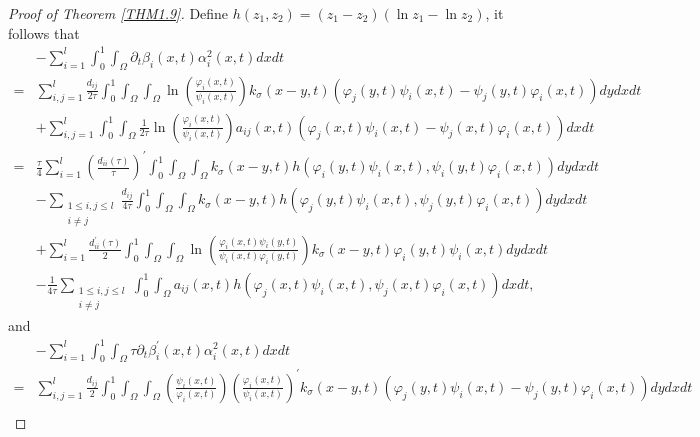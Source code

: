 \documentclass[11pt,reqno]{amsart}
\numberwithin{equation}{section}
\begin{document}
\begin{proof}[Proof of Theorem \ref{THM1.9}]
Define $h(z_{1},z_{2})=(z_{1}-z_{2})\left( \ln z_{1} - \ln z_{2} \right)$, it follows that
\begin{align}\label{3-21}
&- \sum_{i=1}^{l} \int_{0}^{1}  \int_{\Omega} \partial_{t}\beta_{i}(x,t)\alpha_{i}^{2}(x,t) dx dt
\\ \nonumber
=& \sum_{i,j=1}^{l} \frac{d_{ij}}{2\tau} \int_{0}^{1}  \int_{\Omega} \int_{\Omega}  \ln\left( \frac{\varphi_{i}(x,t)}{\psi_{i}(x,t)} \right) k_{\sigma}(x-y,t) \left( \varphi_{j}(y,t)\psi_{i}(x,t)-\psi_{j}(y,t)\varphi_{i}(x,t) \right)dydxdt
\\ \nonumber
& +\sum_{i,j=1}^{l} \int_{0}^{1}  \int_{\Omega} \frac{1}{2\tau} \ln\left( \frac{\varphi_{i}(x,t)}{\psi_{i}(x,t)} \right) a_{ij}(x,t)\left( \varphi_{j}(x,t)\psi_{i}(x,t)-\psi_{j}(x,t)\varphi_{i}(x,t) \right)dxdt
\\ \nonumber
=& \frac{\tau}{4} \sum_{i=1}^{l}\left( \frac{d_{ii}(\tau)}{\tau} \right)^{\prime}\int_{0}^{1}  \int_{\Omega} \int_{\Omega} k_{\sigma}(x-y,t) h(\varphi_{i}(y,t)\psi_{i}(x,t),\psi_{i}(y,t)\varphi_{i}(x,t))  dydxdt
\\ \nonumber
&- \sum_{\substack{ 1\leq i,j \leq l \\i\neq j }}\frac{d_{ij}}{4 \tau}  \int_{0}^{1}  \int_{\Omega} \int_{\Omega} k_{\sigma}(x-y,t) h(\varphi_{j}(y,t)\psi_{i}(x,t),\psi_{j}(y,t)\varphi_{i}(x,t)) dydxdt
\\ \nonumber
&+ \sum_{i=1}^{l} \frac{d_{ii}^{\prime}(\tau)}{2} \int_{0}^{1}\int_{\Omega}\int_{\Omega} \ln \left( \frac{\varphi_{i}(x,t)\psi_{i}(y,t)}{\psi_{i}(x,t)\varphi_{i}(y,t)} \right)k_{\sigma}(x-y,t)\varphi_{i}(y,t)\psi_{i}(x,t)dydxdt
\\ \nonumber
&-  \frac{1}{4\tau} \sum_{\substack{ 1\leq i,j \leq l \\i\neq j }} \int_{0}^{1}  \int_{\Omega} a_{ij}(x,t) h(\varphi_{j}(x,t)\psi_{i}(x,t),\psi_{j}(x,t)\varphi_{i}(x,t))  dxdt,
\end{align}
%
and
%
\begin{equation}\label{3-22}
\begin{aligned}
&- \sum_{i=1}^{l} \int_{0}^{1}  \int_{\Omega} \tau \partial_{t}\beta_{i}^{\prime}(x,t)\alpha_{i}^{2}(x,t)dxdt\\
=& \sum_{i,j=1}^{l} \frac{d_{ij}}{2} \int_{0}^{1}  \int_{\Omega} \int_{\Omega} \left( \frac{\psi_{i}(x,t)}{\varphi_{i}(x,t)} \right) \left( \frac{\varphi_{i}(x,t)}{\psi_{i}(x,t)} \right)^{\prime} k_{\sigma}(x-y,t)\left(  \varphi_{j}(y,t)\psi_{i}(x,t) - \psi_{j}(y,t)\varphi_{i}(x,t)  \right)dydxdt\\

\end{aligned}
\end{equation}
\end{proof}
\end{document}
